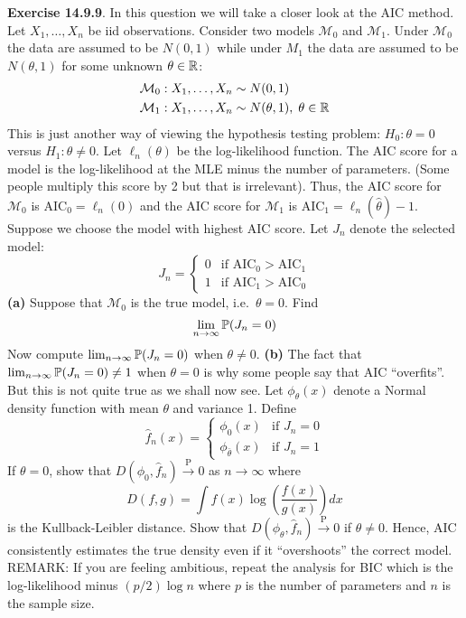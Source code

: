 \textbf{Exercise 14.9.9}. In this question we will take a closer look at the AIC method. Let \(X_{1}, \dots, X_{n}\) be iid observations. Consider two models \(\mathcal{M}_{0}\) and \(\mathcal{M}_{1}\). Under \(\mathcal{M}_{0}\) the data are assumed to be \(N(0, 1)\) while under \(M_{1}\) the data are assumed to be \(N(\theta, 1)\) for some unknown \(\theta \in \mathbb{R}\):
\begin{align*}
\mathcal{M}_{0} : X_{1}, \dots, X_{n} &\sim N(0, 1) \\
\mathcal{M}_{1} : X_{1}, \dots, X_{n} &\sim N(\theta, 1), \; \theta \in \mathbb{R}
\end{align*}
This is just another way of viewing the hypothesis testing problem: \(H_{0}: \theta = 0\) versus \(H_{1}: \theta \neq 0\). Let \(\ell_{n}(\theta)\) be the log-likelihood function. The AIC score for a model is the log-likelihood at the MLE minus the number of parameters. (Some people multiply this score by 2 but that is irrelevant). Thus, the AIC score for \(\mathcal{M}_{0}\) is \(\text{AIC}_{0} = \ell_{n}(0)\) and the AIC score for \(\mathcal{M}_{1}\) is \(\text{AIC}_{1} = \ell_{n}(\hat{\theta}) - 1\). Suppose we choose the model with highest AIC score. Let \(J_{n}\) denote the selected model:
\[
J_{n} = 
\begin{cases}
0 & \text{if } \text{AIC}_{0} > \text{AIC}_{1} \\
1 & \text{if } \text{AIC}_{1} > \text{AIC}_{0}
\end{cases}
\]
\textbf{(a)} Suppose that \(\mathcal{M}_{0}\) is the true model, i.e.~\(\theta = 0\). Find
\[
\lim_{n \rightarrow \infty} \operatorname{\mathbb{P}}(J_{n} = 0)
\]
Now compute \(\lim_{n \rightarrow \infty} \operatorname{\mathbb{P}}(J_{n} = 0)\) when \(\theta \neq 0\).
\textbf{(b)} The fact that \(\lim_{n \rightarrow \infty} \operatorname{\mathbb{P}}(J_{n} = 0) \neq 1\) when \(\theta = 0\) is why some people say that AIC ``overfits''. But this is not quite true as we shall now see. Let \(\phi_\theta(x)\) denote a Normal density function with mean \(\theta\) and variance 1. Define
\[
\hat{f}_{n}(x) = 
\begin{cases}
\phi_{0}(x) & \text{if } J_{n} = 0 \\
\phi_{\bar{\theta}}(x) & \text{if } J_{n} = 1
\end{cases}
\]
If \(\theta = 0\), show that
\(D(\phi_{0}, \hat{f}_{n}) \xrightarrow{\textrm{P}} 0\) as
\(n \rightarrow \infty\) where
\[
D(f, g) = \int f(x) \log \left( \frac{f(x)}{g(x)} \right) dx 
\]
is the Kullback-Leibler distance. Show that
\(D(\phi_\theta, \hat{f}_{n}) \xrightarrow{\textrm{P}} 0\) if
\(\theta \neq 0\). Hence, AIC consistently estimates the true density
even if it ``overshoots'' the correct model.
REMARK: If you are feeling ambitious, repeat the analysis for BIC which
is the log-likelihood minus \((p / 2) \log n\) where \(p\) is the number
of parameters and \(n\) is the sample size.

